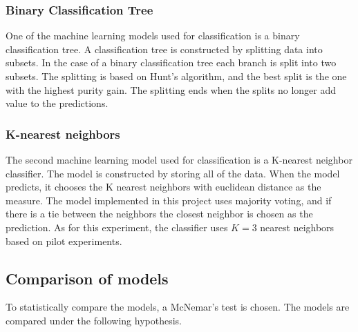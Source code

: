 \documentclass[11pt, fleqn, titlepage]{article}
\begin{document}
\subsubsection*{Binary Classification Tree}
One of the machine learning models used for classification is a binary classification tree. A classification tree is constructed by splitting data into subsets. In the case of a binary classification tree each branch is split into two subsets. The splitting is based on Hunt's algorithm, and the best split is the one with the highest purity gain. The splitting ends when the splits no longer add value to the predictions. 

\subsubsection*{K-nearest neighbors}
The second machine learning model used for classification is a K-nearest neighbor classifier. The model is constructed by storing all of the data. When the model predicts, it chooses the K nearest neighbors with euclidean distance as the measure. The model implemented in this project uses majority voting, and if there is a tie between the neighbors the closest neighbor is chosen as the prediction. As for this experiment, the classifier uses $ K=3 $ nearest neighbors based on pilot experiments.

\subsection*{Comparison of models}
To statistically compare the models, a McNemar's test is chosen. The models are compared under the following hypothesis. 
\end{document}
